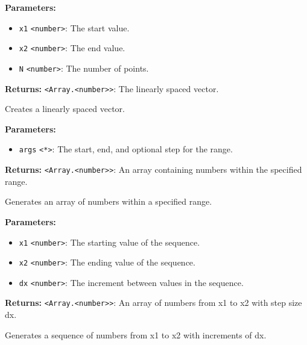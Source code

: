 \documentclass[12pt,a4paper]{article}
\begin{document}
\noindent \textbf{Parameters:}
\begin{itemize}
  \item \texttt{x1} \texttt{<number>}: The start value.
  \item \texttt{x2} \texttt{<number>}: The end value.
  \item \texttt{N} \texttt{<number>}: The number of points.
\end{itemize}

\noindent \textbf{Returns:} \texttt{<Array.<number>>}: The linearly spaced vector.

\noindent Creates a linearly spaced vector.

\vspace{5mm}
\noindent {}


\noindent \textbf{Parameters:}
\begin{itemize}
  \item \texttt{args} \texttt{<*>}: The start, end, and optional step for the range.
\end{itemize}

\noindent \textbf{Returns:} \texttt{<Array.<number>>}: An array containing numbers within the specified range.

\noindent Generates an array of numbers within a specified range.

\vspace{5mm}
\noindent {}


\noindent \textbf{Parameters:}
\begin{itemize}
  \item \texttt{x1} \texttt{<number>}: The starting value of the sequence.
  \item \texttt{x2} \texttt{<number>}: The ending value of the sequence.
  \item \texttt{dx} \texttt{<number>}: The increment between values in the sequence.
\end{itemize}

\noindent \textbf{Returns:} \texttt{<Array.<number>>}: An array of numbers from \textasciigrave{}x1\textasciigrave{} to \textasciigrave{}x2\textasciigrave{} with step size \textasciigrave{}dx\textasciigrave{}.

\noindent Generates a sequence of numbers from \textasciigrave{}x1\textasciigrave{} to \textasciigrave{}x2\textasciigrave{} with increments of \textasciigrave{}dx\textasciigrave{}.
\end{document}
